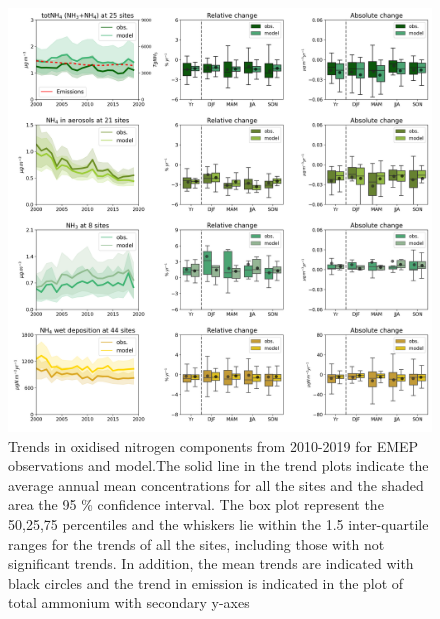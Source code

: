 \begin{figure}
	\centering
	\includegraphics[width=0.74\paperwidth]{FIGS_TRENDS/Nred_trends.png}
	\caption{\label{fig:Nred_trends}Trends in oxidised nitrogen components from 2010-2019 for EMEP observations and model.The solid line in the trend plots indicate the average annual mean concentrations for all the sites and the shaded area the 95 \% confidence interval. The box plot represent the 50,25,75 percentiles and the whiskers lie within the 1.5 inter-quartile ranges for the trends of all the sites, including those with not significant trends. In addition, the mean trends are indicated with black circles and the trend in \nhiii emission is indicated in the plot of total ammonium with secondary y-axes}
\end{figure}

